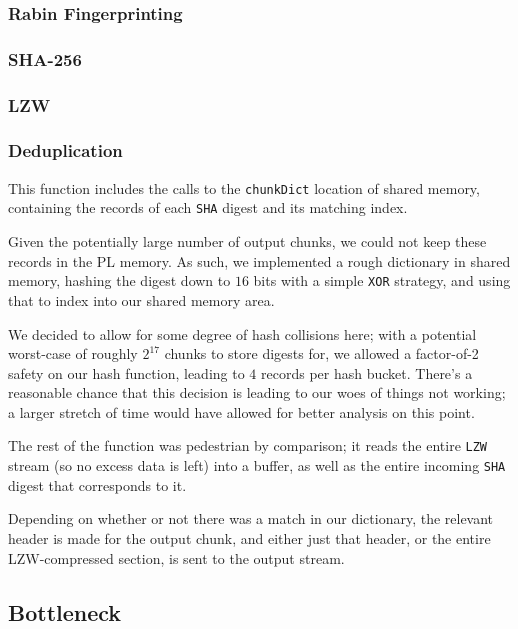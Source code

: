 \documentclass{article}
\begin{document}
\subsubsection{Rabin Fingerprinting}

\subsubsection{SHA-256}

\subsubsection{LZW}

\subsubsection{Deduplication}

This function includes the calls to the \texttt{chunkDict} location of shared memory, containing the records of each \texttt{SHA} digest and its matching index.
\newline\par
Given the potentially large number of output chunks, we could not keep these records in the PL memory. 
As such, we implemented a rough dictionary in shared memory, hashing the digest down to $16$ bits with a simple \texttt{XOR} strategy,
and using that to index into our shared memory area.
\par
We decided to allow for some degree of hash collisions here; with a potential worst-case of roughly $2^{17}$ chunks to store digests for,
we allowed a factor-of-2 safety on our hash function, leading to $4$ records per hash bucket. 
There's a reasonable chance that this decision
is leading to our woes of things not working; a larger stretch of time would have allowed for better analysis on this point.

\newline\par
The rest of the function was pedestrian by comparison; it reads the entire \texttt{LZW} stream (so no excess data is left) into a buffer,
as well as the entire incoming \texttt{SHA} digest that corresponds to it.
\par
Depending on whether or not there was a match in our dictionary, the relevant header is made for the output chunk,
and either just that header, or the entire LZW-compressed section, is sent to the output stream.


\subsection{Bottleneck}
\end{document}
